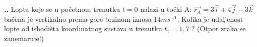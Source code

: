 
\noindent 
\textbf{
\thecjelina.\thezadatak.}
Lopta koje se u početnom trenutku $t=0$ nalazi u točki A: $\vec{r_A}=3\vec{i}+4\vec{j}-3\vec{k}$  bačena je vertikalno prema gore brzinom iznosa $14 ms^{-1}$. Kolika je udaljenost lopte od ishodišta koordinatnog sustava u trenutku  $t_1=1,7$˙? (Otpor zraka se zanemaruje!)


